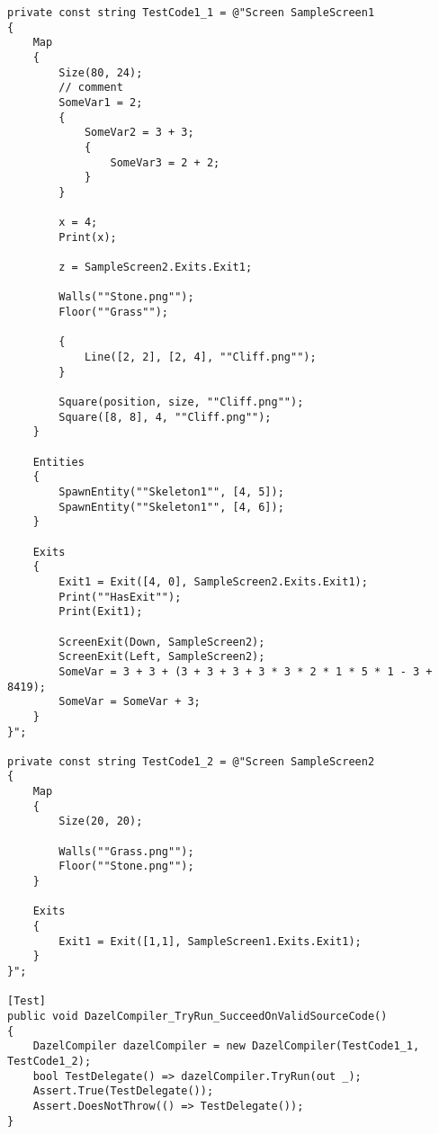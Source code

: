 \begin{lstlisting}[label={lst:integrationTest1}, caption={\dazel{} compiler integration test verifying that source code can be read and compiled}, language=CSharp, escapechar=|]
private const string TestCode1_1 = @"Screen SampleScreen1
{
    Map 
    {
        Size(80, 24);
        // comment
        SomeVar1 = 2;
        {
            SomeVar2 = 3 + 3;
            {
                SomeVar3 = 2 + 2;
            }
        }
        
        x = 4;
        Print(x);
        
        z = SampleScreen2.Exits.Exit1;
                        
        Walls(""Stone.png""); 
        Floor(""Grass"");
        
        {
            Line([2, 2], [2, 4], ""Cliff.png"");
        }

        Square(position, size, ""Cliff.png"");
        Square([8, 8], 4, ""Cliff.png"");
    }

    Entities 
    {
        SpawnEntity(""Skeleton1"", [4, 5]);
        SpawnEntity(""Skeleton1"", [4, 6]);
    }
    
    Exits 
    {
        Exit1 = Exit([4, 0], SampleScreen2.Exits.Exit1);
        Print(""HasExit"");
        Print(Exit1);

        ScreenExit(Down, SampleScreen2);
        ScreenExit(Left, SampleScreen2);
        SomeVar = 3 + 3 + (3 + 3 + 3 + 3 * 3 * 2 * 1 * 5 * 1 - 3 + 8419);
        SomeVar = SomeVar + 3;
    }
}";

private const string TestCode1_2 = @"Screen SampleScreen2
{
    Map 
    {
        Size(20, 20);
        
        Walls(""Grass.png""); 
        Floor(""Stone.png"");
    }
    
    Exits 
    {
        Exit1 = Exit([1,1], SampleScreen1.Exits.Exit1);
    }
}";

[Test]
public void DazelCompiler_TryRun_SucceedOnValidSourceCode()
{
    DazelCompiler dazelCompiler = new DazelCompiler(TestCode1_1, TestCode1_2);
    bool TestDelegate() => dazelCompiler.TryRun(out _);
    Assert.True(TestDelegate());
    Assert.DoesNotThrow(() => TestDelegate());
}
\end{lstlisting}



